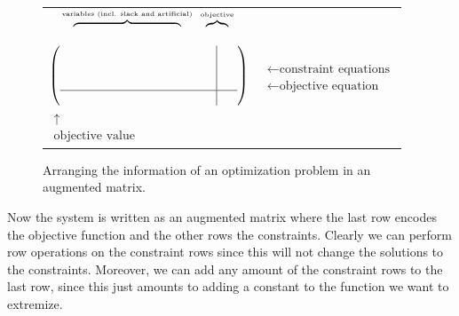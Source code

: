 \begin{figure}
\begin{center}
\begin{tabular}{ll}
\ \ $\overbrace{\phantom{VERYVERYERY}}^{\mbox{\tiny variables (incl. slack and artificial)}}$\ 
$\overbrace{\phantom{F}}^{\mbox{\tiny objective}}$&\\
$
\left(
\begin{array}{c|c}
\phantom{VERYVERYERYFATS}&\phantom{S}\\
\\
\\\hline
\\
\end{array}
\right)
$ &$\begin{array}{l} \\ \leftarrow  \mbox{constraint equations} \\[6mm] \leftarrow \mbox{objective equation}\end{array}$\\
\hspace{4.3cm}$\begin{array}{c}\uparrow\\ \mbox{objective value}\end{array}\!\!\!\!\!\!\!\!$
\end{tabular}
\end{center}
\caption{Arranging the information of an optimization problem in an augmented matrix.\label{augD}}
\end{figure}



Now the system is written as an augmented matrix where the last row encodes the objective function and the other rows the constraints. Clearly 
we can perform row operations on the constraint rows since this will not change the solutions to the constraints. 
Moreover, we can add any amount of the constraint rows to the last row,
since this just amounts to adding a constant to the function we want to extremize.

